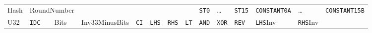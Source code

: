 \documentclass{article}
\begin{document}
\begin{landscape}
\begin{tabular}{lllllllllllllllllllll}
    Hash        & \multicolumn{4}{l}{RoundNumber}                          &              &       &              &              &                         &              & \texttt{ST0} & \dots        & \texttt{ST15} & \multicolumn{3}{l}{\texttt{CONSTANT0A}}            & \dots                & \multicolumn{3}{l}{\texttt{CONSTANT15B}}     \\
    U32         & \texttt{IDC} & \multicolumn{2}{l}{Bits}   & \multicolumn{3}{l}{Inv33MinusBits}  & \texttt{CI}  & \texttt{LHS} & \texttt{RHS}            & \texttt{LT}  & \texttt{AND} & \texttt{XOR} & \texttt{REV}  & \multicolumn{2}{l}{\texttt{LHS}Inv} & \multicolumn{2}{l}{\texttt{RHS}Inv} &              &               &               \\ \bottomrule
\end{tabular}
\end{landscape}
\end{document}
